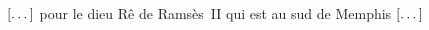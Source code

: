\documentclass[%
  hiero, %
  background, %
  dvipsnames, %
  svgnames, %
  a4paper, %
  twoside, %
  openany, %
  10pt, %
  article, %
  oldfontcommands %
]{nefermemoir}
\newcommand{\lacune}[1][\dots]{%
  \ensuremath{%
    \left[\text{#1}\right]%
  }\xspace%
}
\begin{document}
\lacune pour le dieu Rê de Ramsès~II qui est au sud de Memphis \lacune











\backmatter
\newpage
\listoffigures

\nocite{*}
\printbibliography[heading=memoir,title=Bibliographie]

\end{document}
